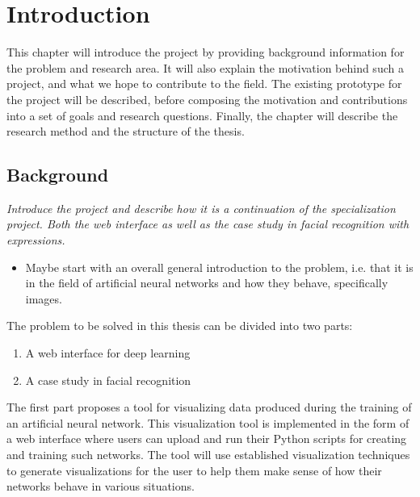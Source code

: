 
\chapter{Introduction}

This chapter will introduce the project by providing background information for the problem and research area. It will also explain the motivation behind such a project, and what we hope to contribute to the field. The existing prototype for the project will be described, before composing the motivation and contributions into a set of goals and research questions. Finally, the chapter will describe the research method and the structure of the thesis.

\section{Background}

\textit{Introduce the project and describe how it is a continuation of the specialization project. Both the web interface as well as the case study in facial recognition with expressions.}

\begin{itemize}
    \item Maybe start with an overall general introduction to the problem, i.e. that it is in the field of artificial neural networks and how they behave, specifically images.
\end{itemize}

\noindent The problem to be solved in this thesis can be divided into two parts:
\begin{enumerate}
    \item A web interface for deep learning
    \item A case study in facial recognition
\end{enumerate}

\noindent The first part proposes a tool for visualizing data produced during the training of an artificial neural network. This visualization tool is implemented in the form of a web interface where users can upload and run their Python scripts for creating and training such networks. The tool will use established visualization techniques to generate visualizations for the user to help them make sense of how their networks behave in various situations. \\

